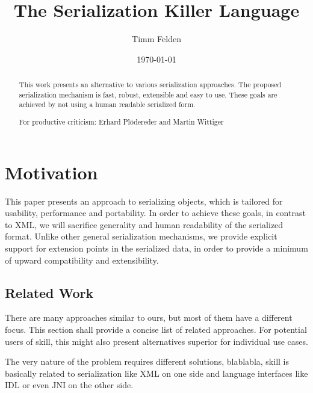 \documentclass[a4paper,10pt]{article}
\title{The Serialization Killer Language}
\author{Timm Felden}
\date{\today}
\begin{document}
\maketitle

\begin{abstract}
 This work presents an alternative to various serialization approaches. The proposed serialization mechanism is fast, robust, extensible and easy to use. These goals are achieved by not using a human readable serialized form. 
\end{abstract}


\renewcommand{\abstractname}{Acknowledgements}
\begin{abstract}
For productive criticism: Erhard Plödereder and Martin Wittiger 
\end{abstract}


\section{Motivation}

This paper presents an approach to serializing objects, which is tailored for usability, performance and portability. In order to achieve these goals, in contrast to XML, we will sacrifice generality and human readability of the serialized format. Unlike other general serialization mechanisms, we provide explicit support for extension points in the serialized data, in order to provide a minimum of upward compatibility and extensibility.

\subsection{Related Work}

There are many approaches similar to ours, but most of them have a different focus. This section shall provide a concise list of related approaches. For potential users of skill, this might also present alternatives superior for individual use cases.

The very nature of the problem requires different solutions, blablabla, skill is basically related to serialization like XML on one side and language interfaces like IDL or even JNI on the other side.
\end{document}
